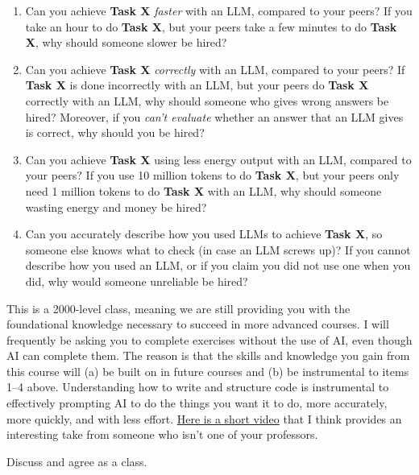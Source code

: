\documentclass[
  letterpaper,
  DIV=11,
  numbers=noendperiod]{scrartcl}
\providecommand{\tightlist}{%
  \setlength{\itemsep}{0pt}\setlength{\parskip}{0pt}}
\begin{document}
\begin{enumerate}
\def\labelenumi{\arabic{enumi}.}
\tightlist
\item
  Can you achieve \textbf{Task X} \emph{faster} with an LLM, compared to
  your peers? If you take an hour to do \textbf{Task X}, but your peers
  take a few minutes to do \textbf{Task X}, why should someone slower be
  hired?
\item
  Can you achieve \textbf{Task X} \emph{correctly} with an LLM, compared
  to your peers? If \textbf{Task X} is done incorrectly with an LLM, but
  your peers do \textbf{Task X} correctly with an LLM, why should
  someone who gives wrong answers be hired? Moreover, if you \emph{can't
  evaluate} whether an answer that an LLM gives is correct, why should
  you be hired?
\item
  Can you achieve \textbf{Task X} using less energy output with an LLM,
  compared to your peers? If you use 10 million tokens to do
  \textbf{Task X}, but your peers only need 1 million tokens to do
  \textbf{Task X} with an LLM, why should someone wasting energy and
  money be hired?
\item
  Can you accurately describe how you used LLMs to achieve \textbf{Task
  X}, so someone else knows what to check (in case an LLM screws up)? If
  you cannot describe how you used an LLM, or if you claim you did not
  use one when you did, why would someone unreliable be hired?
\end{enumerate}

This is a 2000-level class, meaning we are still providing you with the
foundational knowledge necessary to succeed in more advanced courses. I
will frequently be asking you to complete exercises without the use of
AI, even though AI can complete them. The reason is that the skills and
knowledge you gain from this course will (a) be built on in future
courses and (b) be instrumental to items 1--4 above. Understanding how
to write and structure code is instrumental to effectively prompting AI
to do the things you want it to do, more accurately, more quickly, and
with less effort.
\href{https://www.youtube.com/watch?v=A_YE9dC7YdE}{Here is a short
video} that I think provides an interesting take from someone who isn't
one of your professors.

\begin{tcolorbox}[enhanced jigsaw, arc=.35mm, leftrule=.75mm, rightrule=.15mm, colback=white, toprule=.15mm, bottomrule=.15mm, left=2mm, opacitybacktitle=0.6, bottomtitle=1mm, colbacktitle=quarto-callout-important-color!10!white, opacityback=0, colframe=quarto-callout-important-color-frame, coltitle=black, toptitle=1mm, titlerule=0mm, breakable, title=\textcolor{quarto-callout-important-color}{\faExclamation}\hspace{0.5em}{Important}]

Discuss and agree as a class.

\end{tcolorbox}
\end{document}
